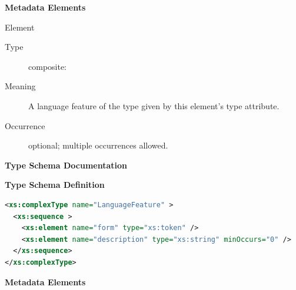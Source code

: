 \documentclass{ivoa}
\begin{document}
\vspace{0.5ex}\noindent\textbf{ Metadata Elements}

\begingroup\small\begin{bigdescription}\item[Element \xmlel{feature}]
\begin{description}
\item[Type] composite: 
\item[Meaning] 
						A language feature of the type given by this
						element's type attribute.
					
\item[Occurrence] optional; multiple occurrences allowed.

\end{description}


\end{bigdescription}\endgroup

\endgroup

\begingroup
      	\renewcommand*\descriptionlabel[1]{%
      	\hbox to 5.5em{\emph{#1}\hfil}}
      	\vspace{2ex}\noindent\textbf{ Type Schema Documentation}


\vspace{1ex}\noindent\textbf{ Type Schema Definition}

\begin{lstlisting}[language=XML,basicstyle=\footnotesize]
<xs:complexType name="LanguageFeature" >
  <xs:sequence >
    <xs:element name="form" type="xs:token" />
    <xs:element name="description" type="xs:string" minOccurs="0" />
  </xs:sequence>
</xs:complexType>
\end{lstlisting}

\vspace{0.5ex}\noindent\textbf{ Metadata Elements}
\end{document}
